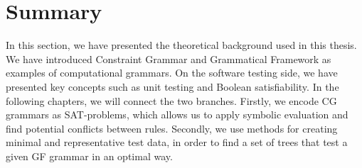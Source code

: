 




\section{Summary}

In this section, we have presented the theoretical background used in this thesis. 
We have introduced Constraint Grammar and Grammatical Framework as examples of computational grammars.
On the software testing side, we have presented key concepts such as unit testing and 
Boolean satisfiability. %
In the following chapters, we will connect the two branches. Firstly, we encode CG grammars as SAT-problems, which allows us to apply symbolic evaluation and find potential conflicts between rules. 
Secondly, we use methods for creating minimal and representative test data, in order to find a set of trees that test a given GF grammar in an optimal way.



